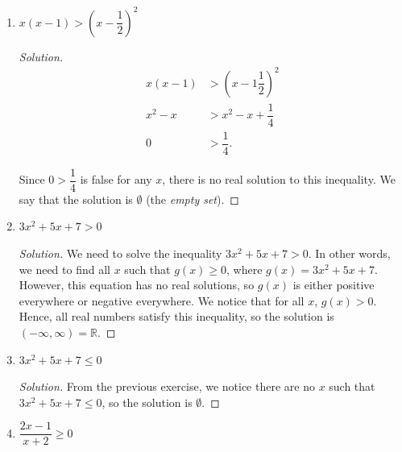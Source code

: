 \documentclass[12pt]{article}
\newenvironment{solution}{\begin{proof}[Solution]}{\end{proof}}
\begin{document}
\begin{enumerate}
\begin{enumerate}
\begin{solution}
				\[
				\begin{tikzpicture}[scale=1]
					\draw[->] (-5,0) -- (5,0);
					
					\draw (-2.5,0) node[circle,blue,fill,inner sep=2pt]{};
					\draw (1.5,0) node[circle,blue,fill,inner sep=2pt]{};
					
					\node at (-2.5, .5) {1};
					\node at (1.5, .5) {3};
					\node at (-5,.5) {$g\colon$};
					\node at (-3.5,.5) {$+$};
					\node at (-0.4,.5) {$-$};
					\node at (3, .5) {$+$};
				\end{tikzpicture}
				\]
				
				Since we are trying to find all $x$ such that $x^2-4x+3$ is negative or equal to $0$, using the sign chart, the solution is $[1.3]$.
				
			\end{solution}
			\item $x(x-1)>(x-\dfrac{1}{2})^2$
			
			
			\begin{solution}
				\begin{align*}
					x(x-1)&>(x-1\dfrac{1}{2})^2\\
					x^2-x&>x^2-x+\dfrac{1}{4}\\
					0&>\dfrac{1}{4}.
				\end{align*}
				
				Since $0>\dfrac{1}{4}$ is false for any $x$, there is no real solution to this inequality. We say that the solution is $\emptyset$ (the \textit{empty set}).
			\end{solution}
			\item $3x^2+5x+7>0$
			
			
			\begin{solution}
				We need to solve the inequality $3x^2+5x+7> 0$. In other words, we need to find all $x$ such that $g(x) \geq 0$, where $g(x)=3x^2+5x+7$. However, this equation has no real solutions, so $g(x)$ is either positive everywhere or negative everywhere. We notice that for all $x$, $g(x)>0$. Hence, all real numbers satisfy this inequality, so the solution is $(-\infty,\infty)=\mathbb{R}$.
			\end{solution}
			\item $3x^2+5x+7\leq 0$
			
			
			\begin{solution}
				From the previous exercise, we notice there are no $x$ such that $3x^2+5x+7\leq 0$, so the solution is $\emptyset$.
			\end{solution}
			\item $\dfrac{2x-1}{x+2}\geq 0$
			

\end{enumerate}
\end{enumerate}
\end{document}

